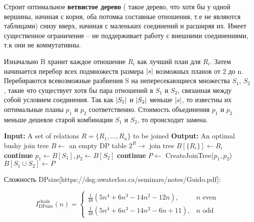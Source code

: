 \documentclass[12pt]{article}
\begin{document}
\begin{flushleft}
Строит оптимальное \textbf{ветвистое дерево} ( такое дерево, что хотя бы у одной вершины,
начиная с корня, оба потомка составные отношения, т.е не являются таблицами)
снизу вверх, начиная с маленьких соединений и расширяя их. Имеет существенное ограничение -- 
не поддерживает работу с внешними соединениями, т.к они не коммутативны.


Изначально B хранит каждое отношение $R_i$ как лучший план для $R_i$. 
Затем начинается перебор всех подмножеств размера $\lvert s\rvert$ возможных 
планов от 2 до n. Перебираются всевозможные разбиения S на непересекающиеся 
множества $S_1$, $S_2$, такие что существует хотя бы пара отношений в $S_1$ 
и $S_2$, связанная между собой условием соединения. Так как $\lvert S_1\rvert$ и 
$\lvert S_2\rvert$ меньше $\lvert s\rvert$, то известны их оптимальные планы $p_1$ и $p_2$ соответственно. 
Стоимость объединения $p_1$ и $p_2$ меньше дешевле старой комбинации $S_1$ и 
$S_2$,  то происходит замена.

\begin{algorithm}
    \begin{algorithmic}[1]
        \State \textbf{Input:} A set of relations $R = \{R_1, \dots, R_n\}$ to be joined
        \State \textbf{Output:} An optimal bushy join tree
        \State $B \gets$ an empty DP table $2^R \to$ join tree
            \State $B[\{R_i\}] \gets R_i$
        \EndFor
                    \State \textbf{continue}
                \EndIf
                \State $p_1 \gets B[S_1], p_2 \gets B[S_2]$
                 \textbf{continue} \EndIf
                \State $P \gets$ CreateJoinTree($p_1, p_2$)
                    \State $B[S_1 \cup S_2] \gets P$
                \EndIf
            \EndFor
        \EndFor
    \end{algorithmic}
\end{algorithm}

Сложность DPsize[https://dsg.uwaterloo.ca/seminars/notes/Guido.pdf]:

\[
I^{\text{chain}}_{\text{DPsize}}(n) =
\begin{cases}
    \frac{1}{48} (5n^4 + 6n^3 - 14n^2 - 12n), & n \text{ even} \\
    \frac{1}{48} (5n^4 + 6n^3 - 14n^2 - 6n + 11), & n \text{ odd}
\end{cases}
\]


\end{flushleft}
\end{document}
